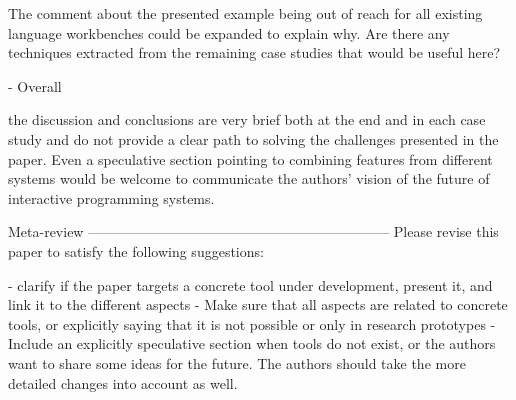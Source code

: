The comment about the presented example being out of reach for all existing language workbenches could be expanded to explain why. Are there any techniques extracted from the remaining case studies that would be useful here?

- Overall

the discussion and conclusions are very brief both at the end and in each case study and do not provide a clear path to solving the challenges presented in the paper. Even a speculative section pointing to combining features from different systems would be welcome to communicate the authors' vision of the future of interactive programming systems.


Meta-review
-----------------------------------------------------------------
Please revise this paper to satisfy the following suggestions:

- clarify if the paper targets a concrete tool under development, present it, and link it to the different aspects
- Make sure that all aspects are related to concrete tools, or explicitly saying that it is not possible or only in research prototypes
- Include an explicitly speculative section when tools do not exist, or the authors want to share some ideas for the future. The authors should take the more detailed changes into account as well.